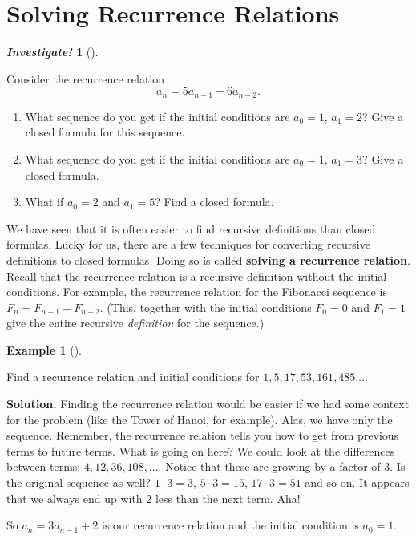 \documentclass[10pt,]{book}
\newcommand{\terminology}[1]{\textbf{#1}}
\theoremstyle{plain}
\theoremstyle{definition}
\newtheorem{example}[theorem]{Example}
\theoremstyle{definition}
\newtheorem{investigation}[project]{\emph{Investigate!}}
\theoremstyle{definition}
\numberwithin{equation}{chapter}
\begin{document}
\section[Solving Recurrence Relations]{Solving Recurrence Relations}\label{sec_recurrence}
\typeout{************************************************}
\typeout{************************************************}
\begin{investigation}[]\label{investigation-21}

Consider the recurrence relation
\begin{equation*}
  a_n = 5a_{n-1} - 6a_{n-2}.
\end{equation*}
\leavevmode%
\begin{enumerate}
\item\hypertarget{li-933}{}
What sequence do you get if the initial conditions are \(a_0 = 1\), \(a_1 = 2\)? Give a closed formula for this sequence.
%
\item\hypertarget{li-934}{}
What sequence do you get if the initial conditions are \(a_0 = 1\), \(a_1 = 3\)? Give a closed formula.
%
\item\hypertarget{li-935}{}
What if \(a_0 = 2\) and \(a_1 = 5\)? Find a closed formula.
%
\end{enumerate}

\end{investigation}

We have seen that it is often easier to find recursive definitions than closed formulas. Lucky for us, there are a few techniques for converting recursive definitions to closed formulas. Doing so is called \terminology{solving a recurrence relation}. Recall that the recurrence relation is a recursive definition without the initial conditions. For example, the recurrence relation for the Fibonacci sequence is \(F_n = F_{n-1} + F_{n-2}\). (This, together with the initial conditions \(F_0 = 0\) and \(F_1 = 1\) give the entire recursive \emph{definition} for the sequence.)
%
\begin{example}[]\label{example-72}

Find a recurrence relation and initial conditions for \(1, 5, 17, 53, 161, 485\ldots\).
%
\par\medskip\noindent%
\textbf{Solution.}\quad
Finding the recurrence relation would be easier if we had some context for the problem (like the Tower of Hanoi, for example). Alas, we have only the sequence. Remember, the recurrence relation tells you how to get from previous terms to future terms. What is going on here? We could look at the differences between terms: \(4, 12, 36, 108, \ldots\). Notice that these are growing by a factor of 3. Is the original sequence as well? \(1\cdot 3 = 3\), \(5 \cdot 3 = 15\), \(17 \cdot 3 = 51\) and so on. It appears that we always end up with 2 less than the next term. Aha!
%
\par

So \(a_n = 3a_{n-1} + 2\) is our recurrence relation and the initial condition is \(a_0 = 1\).
%
\end{example}
\par
\end{document}
